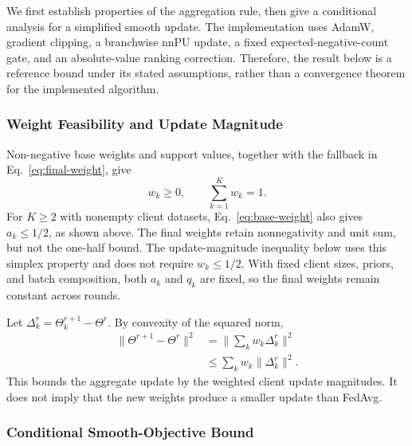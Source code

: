 \documentclass[lettersize,journal]{IEEEtran}
\begin{document}
We first establish properties of the aggregation rule, then give a conditional analysis for a simplified smooth update. The implementation uses AdamW, gradient clipping, a branchwise nnPU update, a fixed expected-negative-count gate, and an absolute-value ranking correction. Therefore, the result below is a reference bound under its stated assumptions, rather than a convergence theorem for the implemented algorithm.

\subsubsection{Weight Feasibility and Update Magnitude}

Non-negative base weights and support values, together with the fallback in Eq.~\eqref{eq:final-weight}, give
\begin{equation}
w_k\geq0,\qquad \sum_{k=1}^{K}w_k=1.
\label{eq:weight-simplex}
\end{equation}
For $K\geq2$ with nonempty client datasets, Eq.~\eqref{eq:base-weight} also gives $a_k\leq1/2$, as shown above. The final weights retain nonnegativity and unit sum, but not the one-half bound. The update-magnitude inequality below uses this simplex property and does not require $w_k\leq1/2$. With fixed client sizes, priors, and batch composition, both $a_k$ and $q_k$ are fixed, so the final weights remain constant across rounds.

Let $\Delta_k^r=\Theta_k^{r+1}-\Theta^r$. By convexity of the squared norm,
\begin{equation}
\begin{aligned}
\|\Theta^{r+1}-\Theta^r\|^2
&=\Big\|\sum_k w_k\Delta_k^r\Big\|^2\\
&\leq\sum_k w_k\|\Delta_k^r\|^2.
\end{aligned}
\label{eq:update-bound}
\end{equation}
This bounds the aggregate update by the weighted client update magnitudes. It does not imply that the new weights produce a smaller update than FedAvg.

\subsubsection{Conditional Smooth-Objective Bound}
\end{document}
